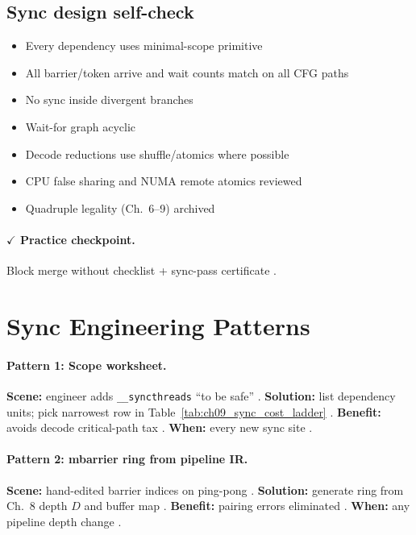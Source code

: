\subsection{Sync design self-check}
\begin{itemize}
\item[$\square$] Every dependency uses minimal-scope primitive
\item[$\square$] All barrier/token arrive and wait counts match on all CFG paths
\item[$\square$] No sync inside divergent branches
\item[$\square$] Wait-for graph acyclic
\item[$\square$] Decode reductions use shuffle/atomics where possible
\item[$\square$] CPU false sharing and NUMA remote atomics reviewed
\item[$\square$] Quadruple legality (Ch.~6--9) archived
\end{itemize}

\paragraph{$\checkmark$ Practice checkpoint.}
Block merge without checklist + sync-pass certificate \citep{yirage2026,chen2020compilerbasedhardw,taxbreak2026}.

\section{Sync Engineering Patterns}
\label{sec:ch09_sync_patterns}

\paragraph{Pattern 1: Scope worksheet.}
\textbf{Scene:} engineer adds \texttt{\_\_syncthreads} ``to be safe'' \citep{shah2024flashattention3,taxbreak2026}.
\textbf{Solution:} list dependency units; pick narrowest row in Table~\ref{tab:ch09_sync_cost_ladder} \citep{yirage2026,nvidia2022hopper}.
\textbf{Benefit:} avoids decode critical-path tax \citep{patel2025llminference,memoryfloor2026}.
\textbf{When:} every new sync site \citep{chen2020compilerbasedhardw}.

\paragraph{Pattern 2: mbarrier ring from pipeline IR.}
\textbf{Scene:} hand-edited barrier indices on ping-pong \citep{semianalysis2024tma,dao2022flashattention}.
\textbf{Solution:} generate ring from Ch.~8 depth $D$ and buffer map \citep{yirage2026,shah2024flashattention3}.
\textbf{Benefit:} pairing errors eliminated \citep{wu2024mirage,chen2020compilerbasedhardw}.
\textbf{When:} any pipeline depth change \citep{taxbreak2026}.

